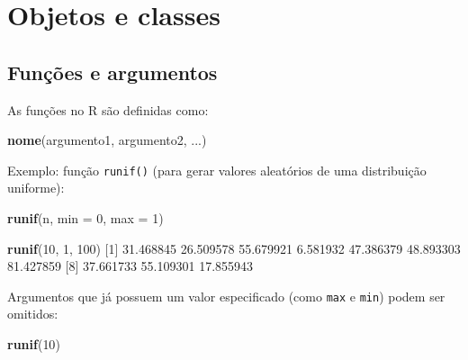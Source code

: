\documentclass[10pt,a4paper]{book}
\newenvironment{Shaded}{\begin{snugshade}}{\end{snugshade}}
\newcommand{\KeywordTok}[1]{\textcolor[rgb]{0.13,0.29,0.53}{\textbf{#1}}}
\newcommand{\DataTypeTok}[1]{\textcolor[rgb]{0.13,0.29,0.53}{#1}}
\newcommand{\DecValTok}[1]{\textcolor[rgb]{0.00,0.00,0.81}{#1}}
\newcommand{\FloatTok}[1]{\textcolor[rgb]{0.00,0.00,0.81}{#1}}
\newcommand{\NormalTok}[1]{#1}
\begin{document}
\chapter{Objetos e classes}\label{objetos-e-classes}

\section{Funções e argumentos}\label{funuxe7uxf5es-e-argumentos}

As funções no R são definidas como:

\begin{Shaded}
\begin{Highlighting}[]
\KeywordTok{nome}\NormalTok{(argumento1, argumento2, ...)}
\end{Highlighting}
\end{Shaded}

Exemplo: função \texttt{runif()} (para gerar valores aleatórios de uma
distribuição uniforme):

\begin{Shaded}
\begin{Highlighting}[]
\KeywordTok{runif}\NormalTok{(n, }\DataTypeTok{min =} \DecValTok{0}\NormalTok{, }\DataTypeTok{max =} \DecValTok{1}\NormalTok{)}
\end{Highlighting}
\end{Shaded}

\begin{Shaded}
\begin{Highlighting}[]
\KeywordTok{runif}\NormalTok{(}\DecValTok{10}\NormalTok{, }\DecValTok{1}\NormalTok{, }\DecValTok{100}\NormalTok{)}
\NormalTok{ [}\DecValTok{1}\NormalTok{] }\FloatTok{31.468845} \FloatTok{26.509578} \FloatTok{55.679921}  \FloatTok{6.581932} \FloatTok{47.386379} \FloatTok{48.893303} \FloatTok{81.427859}
\NormalTok{ [}\DecValTok{8}\NormalTok{] }\FloatTok{37.661733} \FloatTok{55.109301} \FloatTok{17.855943}
\end{Highlighting}
\end{Shaded}

Argumentos que já possuem um valor especificado (como \texttt{max} e
\texttt{min}) podem ser omitidos:

\begin{Shaded}
\begin{Highlighting}[]
\KeywordTok{runif}\NormalTok{(}\DecValTok{10}\NormalTok{)}
\end{Highlighting}
\end{Shaded}
\end{document}
